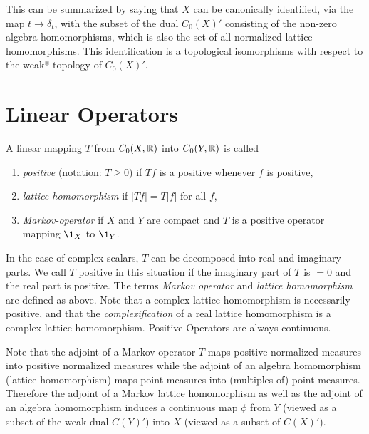 This can be summarized by saying that $X$ can be canonically identified, via the map $t \to \delta_{t}$, with the subset of the dual $C_{0}(X)'$ consisting of the non-zero algebra homomorphisms, which is also the set of all normalized lattice homomorphisms.
This identification is a topological isomorphisms with respect to the weak*-topology of $ C_{0}(X)' $.
\section{Linear Operators}\label{sec:b1-1.3}%
A linear mapping $T$ from $C_{0}(X,\mathbb{R})$ into $C_{0}(Y,\mathbb{R})$ is called
\begin{enumerate}[\upshape (i), labelindent=.5em]

\item
\emph{positive} (notation: $T \geq 0$)  if $Tf$  is a positive whenever $ f $ is positive, 

\item
\emph{lattice homomorphism}  if $|Tf| = T|f|$  for all $ f $,

\item
\emph{Markov-operator}  if  $ X $ and $ Y $ are compact and $ T $ is a positive operator mapping $\1_{X}$ to $\1_{Y}$.

\end{enumerate}
In the case of complex scalars, $T$ can be decomposed into real and imaginary parts.
We call $T$ positive in this situation if the imaginary part of $T$ is $= 0$ and the real part is positive.
The terms \emph{Markov operator} and \emph{lattice homomorphism} are defined as above.
Note that a complex lattice homomorphism is necessarily positive, and that the \emph{complexification} of a real lattice homomorphism is a complex lattice homomorphism.
Positive Operators are always continuous.

Note that the adjoint of a Markov operator $T$ maps positive normalized measures into positive normalized measures while the adjoint of an algebra homomorphism (lattice homomorphism) maps point measures into (multiples of) point measures.
Therefore the adjoint of a Markov lattice homomorphism as well as the adjoint of an algebra homomorphism induces a continuous map $\phi$ from $Y$ (viewed as a subset of the weak dual $C(Y)'$) into $X$ (viewed as a subset of $C(X)'$).


